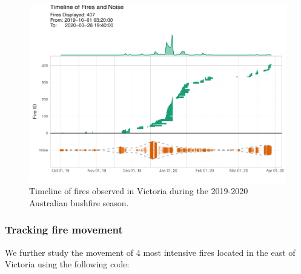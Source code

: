 \begin{Schunk}
\begin{figure}

{\centering \includegraphics[width=0.8\linewidth]{clustering_paper_files/figure-latex/himtimeline-1} 

}

\caption[Timeline of fires observed in Victoria during the 2019-2020 Australian bushfire season]{Timeline of fires observed in Victoria during the 2019-2020 Australian bushfire season.}\label{fig:himtimeline}
\end{figure}
\end{Schunk}

\hypertarget{tracking-fire-movement}{%
\subsubsection{Tracking fire movement}\label{tracking-fire-movement}}

We further study the movement of 4 most intensive fires located in the
east of Victoria using the following code:

